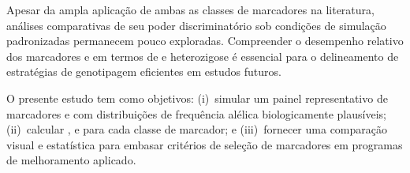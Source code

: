 Apesar da ampla aplicação de ambas as classes de marcadores na
literatura, análises comparativas de seu poder discriminatório sob
condições de simulação padronizadas permanecem pouco exploradas.
Compreender o desempenho relativo dos marcadores \snp{} e \ssr{} em
termos de \pic{} e heterozigose é essencial para o delineamento de
estratégias de genotipagem eficientes em estudos futuros.

O presente estudo tem como objetivos: (i)~simular um painel
representativo de marcadores \snp{} e \ssr{} com distribuições de
frequência alélica biologicamente plausíveis; (ii)~calcular \pic{},
\he{} e \ho{} para cada classe de marcador; e (iii)~fornecer uma
comparação visual e estatística para embasar critérios de seleção de
marcadores em programas de melhoramento aplicado.
